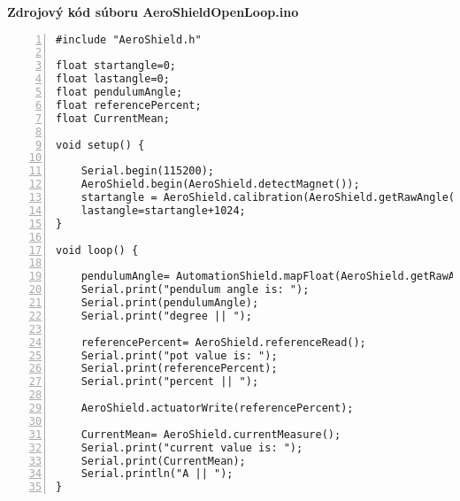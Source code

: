 \LARGE\bf{Zdrojový kód súboru AeroShieldOpenLoop.ino}
\label{AeroShieldOpenLoop.ino}
\vspace{1cm}
\begin{lstlisting}[numbers=left,basicstyle=\scriptsize,caption={Zdrojový kód súboru AeroShieldOpenLoop.ino.},captionpos=b]	
#include "AeroShield.h" 

float startangle=0; 
float lastangle=0; 
float pendulumAngle;  
float referencePercent;  
float CurrentMean; 

void setup() {
	
	Serial.begin(115200);   
	AeroShield.begin(AeroShield.detectMagnet());
	startangle = AeroShield.calibration(AeroShield.getRawAngle());
	lastangle=startangle+1024;  
}

void loop() {
	
	pendulumAngle= AutomationShield.mapFloat(AeroShield.getRawAngle(),startangle,lastangle,0.00,90.00);
	Serial.print("pendulum angle is: ");
	Serial.print(pendulumAngle); 
	Serial.print("degree || ");
	
	referencePercent= AeroShield.referenceRead();
	Serial.print("pot value is: ");
	Serial.print(referencePercent);
	Serial.print("percent || ");
	
	AeroShield.actuatorWrite(referencePercent); 
	
	CurrentMean= AeroShield.currentMeasure();
	Serial.print("current value is: ");
	Serial.print(CurrentMean);   
	Serial.println("A || ");
}
\end{lstlisting}